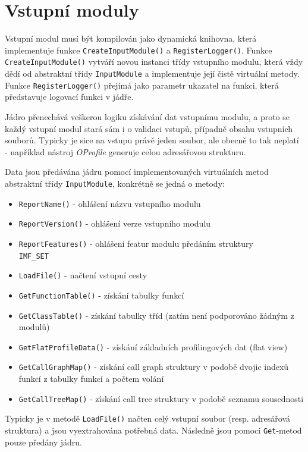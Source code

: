 \documentclass[czech,BP]{thesiskiv}
\begin{document}
\section{Vstupní moduly}

Vstupní modul musí být kompilován jako dynamická knihovna, která implementuje funkce \texttt{CreateInputModule()} a \texttt{RegisterLogger()}. Funkce \texttt{CreateInputModule()} vytváří novou instanci třídy vstupního modulu, která vždy dědí od abstraktní třídy \texttt{InputModule} a implementuje její čistě virtuální metody. Funkce \texttt{RegisterLogger()} přejímá jako parametr ukazatel na funkci, která představuje logovací funkci v jádře.

Jádro přenechává veškerou logiku získávání dat vstupnímu modulu, a proto se každý vstupní modul stará sám i o validaci vstupů, případně obsahu vstupních souborů. Typicky je sice na vstupu právě jeden soubor, ale obecně to tak neplatí - například nástroj \emph{OProfile} generuje celou adresářovou strukturu.

Data jsou předávána jádru pomocí implementovaných virtuálních metod abstraktní třídy \texttt{InputModule}, konkrétně se jedná o metody:

\begin{itemize}
\item \texttt{ReportName()} - ohlášení názvu vstupního modulu
\item \texttt{ReportVersion()} - ohlášení verze vstupního modulu
\item \texttt{ReportFeatures()} - ohlášení featur modulu předáním struktury\\ \texttt{IMF\_SET}
\item \texttt{LoadFile()} - načtení vstupní cesty
\item \texttt{GetFunctionTable()} - získání tabulky funkcí
\item \texttt{GetClassTable()} - získání tabulky tříd (zatím není podporováno žádným z modulů)
\item \texttt{GetFlatProfileData()} - získání základních profilingových dat (flat view)
\item \texttt{GetCallGraphMap()} - získání call graph struktury v podobě dvojic indexů funkcí z tabulky funkcí a počtem volání
\item \texttt{GetCallTreeMap()} - získání call tree struktury v podobě seznamu sousednosti
\end{itemize}

Typicky je v metodě \texttt{LoadFile()} načten celý vstupní soubor (resp. adresářová struktura) a jsou vyextrahována potřebná data. Následně jsou pomocí \texttt{Get}-metod pouze předány jádru.
\end{document}
